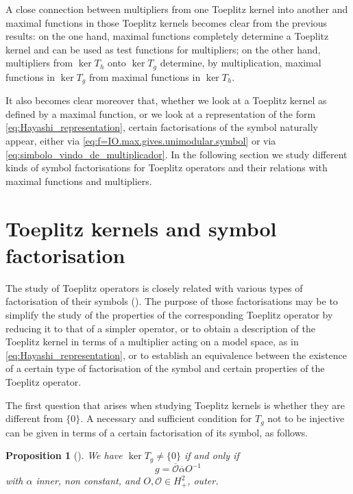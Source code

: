 \documentclass[12pt]{elsarticle}
\numberwithin{equation}{section}
\theoremstyle{plain}
\newtheorem{prop}[thm]{Proposition}
\newcommand{\Hp}{\ensuremath{H^2_+}}
\newcommand{\OO}{\ensuremath{\mathcal{O}}}
\newcommand{\ol}[1]{\ensuremath{\overline{#1}}}
\newcommand{\zero}{\ensuremath{\{0\}}}
\begin{document}
A close connection between multipliers from one Toeplitz kernel into another and maximal functions in those Toeplitz kernels becomes clear from the previous results:
on the one hand, maximal functions completely determine a Toeplitz kernel and can be used as test functions for multipliers;
on the other hand, multipliers from $\ker T_h$ onto $\ker T_g$ determine, by multiplication, maximal functions in $\ker T_g$ from maximal functions in $\ker T_h$.

It also becomes clear moreover that, whether we look at a Toeplitz kernel as defined by a maximal function, or we look at a representation of the form \eqref{eq:Hayashi_representation}, certain factorisations of the symbol naturally appear, either via \eqref{eq:f=IO.max.gives.unimodular.symbol} or via \eqref{eq:simbolo_vindo_de_multiplicador}.
In the following section we study different kinds of symbol factorisations for Toeplitz operators and their relations with maximal functions and multipliers.








\section{Toeplitz kernels and symbol factorisation}
\label{sec:Toeplitz kernels and symbol factorisation}


The study of Toeplitz operators is closely related with various types of factorisation of their symbols (\cite{GoKru92,MiPro86}).
The purpose of those factorisations may be to simplify the study of the properties of the corresponding Toeplitz operator by reducing it to that of a simpler operator, or to obtain a description of the Toeplitz kernel in terms of a multiplier acting on a model space, as in \eqref{eq:Hayashi_representation}, or to establish an equivalence between the existence of a certain type of factorisation of the symbol and certain properties of the Toeplitz operator.

The first question that arises when studying Toeplitz kernels is whether they are different from \zero.
A necessary and sufficient condition for $T_g$ not to be injective can be given in terms of a certain factorisation of its symbol, as follows.

\begin{prop}
[\cite{CMP21}]
\label{prop:ker.not.zero.factorisation}
We have $\ker T_g\neq\zero$ if and only if
\begin{equation}
\label{eq:ker.not.zero.factorisation}
g= \ol\OO \ol\alpha O^{-1}
\end{equation}
with $\alpha$ inner, non constant, and $O,\OO\in\Hp$, outer.
\end{prop}
\end{document}
